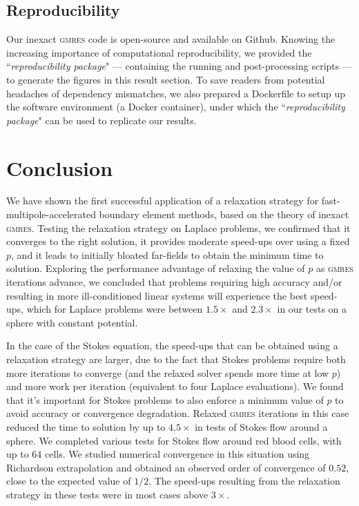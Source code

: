 \documentclass[final,3p,times]{elsarticle}
\newcommand{\gmres}{\textsc{gmres}\xspace}
\begin{document}
\subsection{Reproducibility}

Our inexact \gmres code is open-source and available on Github. Knowing the increasing importance of computational reproducibility, we provided the ``\textit{reproducibility package}" --- containing the running and post-processing scripts --- to generate the figures in this result section. To save readers from potential headaches of dependency mismatches, we also prepared a Dockerfile to setup up the software environment (a Docker container), under which the ``\textit{reproducibility package}" can be used to replicate our results.


\section{Conclusion} 

We have shown the first successful application of a relaxation strategy for fast-multipole-accelerated boundary element methods, based on the theory of inexact \gmres. Testing the relaxation strategy on Laplace problems, we confirmed that it converges to the right solution, it provides moderate speed-ups over using a fixed $p$, and it leads to initially bloated far-fields to obtain the minimum time to solution.
Exploring the performance advantage of relaxing the value of $p$ as \gmres iterations advance, we concluded that problems requiring high accuracy and/or resulting in more ill-conditioned linear systems will experience the best speed-ups, which for Laplace problems were between $1.5\times$ and $2.3\times$ in our tests on a sphere with constant potential.

In the case of the Stokes equation, the speed-ups that can be obtained using a relaxation strategy are larger, due to the fact that Stokes problems require both more iterations to converge (and the relaxed solver spends more time at low $p$) and more work per iteration (equivalent to four Laplace evaluations). 
We found that it's important for Stokes problems to also enforce a minimum value of $p$ to avoid accuracy or convergence degradation.
Relaxed \gmres iterations in this case reduced the time to solution by up to $4.5\times$ in tests of Stokes flow around a sphere. 
We completed various tests for Stokes flow around red blood cells, with up to 64 cells. We studied numerical convergence in this situation using Richardson extrapolation and obtained an observed order of convergence of $0.52$, close to the expected value of $1/2$. The speed-ups resulting from the relaxation strategy in these tests were in most cases above $3\times$.
\end{document}
